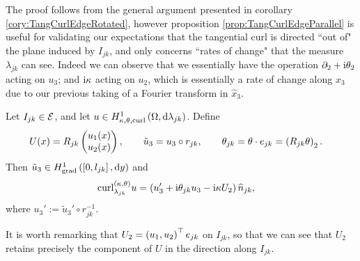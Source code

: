 The proof follows from the general argument presented in corollary \ref{cory:TangCurlEdgeRotated}, however proposition \ref{prop:TangCurlEdgeParallel} is useful for validating our expectations that the tangential curl is directed ``out of" the plane induced by $I_{jk}$, and only concerns ``rates of change" that the measure $\lambda_{jk}$ can see.
Indeed we can observe that we essentially have the operation $\partial_2+\mathrm{i}\theta_2$ acting on $u_3$; and $\mathrm{i}\kappa$ acting on $u_2$, which is essentially a rate of change along $x_3$ due to our previous taking of a  Fourier transform in $\widehat{x}_3$.
\begin{cory} \label{cory:TangCurlEdgeRotated}
	Let $I_{jk}\in\mathcal{E}$, and let $u\in H^1_{\kappa,\theta,\mathrm{curl}}\left( \Omega, \mathrm{d}\lambda_{jk} \right)$.
	Define
	\begin{align*}
		U(x) = R_{jk}\begin{pmatrix} u_1(x) \\ u_2(x) \end{pmatrix},
		\qquad
		\tilde{u}_3 &= u_3\circ r_{jk}, 
		\qquad
		\theta_{jk} = \theta\cdot e_{jk} = \left( R_{jk}\theta \right)_2.
	\end{align*}
	Then $\tilde{u}_3\in H^1_\mathrm{grad}\left( \left[ 0,l_{jk} \right], \mathrm{d}y \right)$ and
	\begin{align*}
		\mathrm{curl}_{\lambda_{jk}}^{\left( \kappa, \theta \right)}u &= \left(  u_3' + \mathrm{i}\theta_{jk}u_3 - \mathrm{i}\kappa U_2  \right)\widehat{n}_{jk},
	\end{align*}
	where $u_3' := \tilde{u}_3'\circ r_{jk}^{-1}$.
\end{cory}
It is worth remarking that $U_2 = \left( u_1,u_2 \right)^{\top}e_{jk}$ on $I_{jk}$, so that we can see that $U_2$ retains precisely the component of $U$ in the direction along $I_{jk}$.
